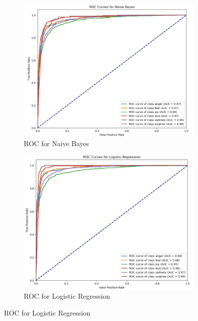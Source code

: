 \begin{figure}[h!]
	\centering
	\begin{subfigure}[b]{0.45\textwidth}
		\centering
		\includegraphics[width=\textwidth]{roc_naive_bayes.png}
		\caption{ROC for Naive Bayes}
		\label{fig:roc_naive_bayes}
	\end{subfigure}
	\hfill
	\begin{subfigure}[b]{0.45\textwidth}
		\centering
		\includegraphics[width=\textwidth]{roc_logistic_regression.png}
		\caption{ROC for Logistic Regression}
		\label{fig:roc_logistic_regression}
	\end{subfigure}
	

\end{figure}
